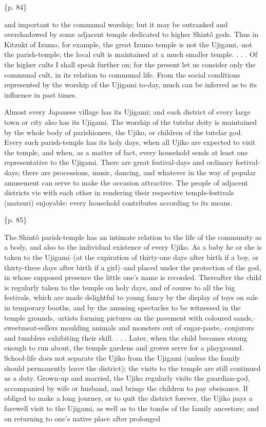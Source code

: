 \{p. 84\}

and important to the communal worship; but it may be outranked and overshadowed by some adjacent temple dedicated to higher Shintô gods. Thus in Kitzuki of Izumo, for example, the great Izumo temple is not the Ujigami,--not the parish-temple; the local cult is maintained at a much smaller temple. . . . Of the higher cults I shall speak further on; for the present let us consider only the communal cult, in its relation to communal life. From the social conditions represented by the worship of the Ujigami to-day, much can be inferred as to its influence in past times.



Almost every Japanese village has its Ujigami; and each district of every large town or city also has its Ujigami. The worship of the tutelar deity is maintained by the whole body of parishioners, the Ujiko, or children of the tutelar god. Every such parish-temple has its holy days, when all Ujiko are expected to visit the temple, and when, as a matter of fact, every household sends at least one representative to the Ujigami. There are great festival-days and ordinary festival-days; there are processions, music, dancing, and whatever in the way of popular amusement can serve to make the occasion attractive. The people of adjacent districts vie with each other in rendering their respective temple-festivals (matsuri) enjoyable: every household contributes according to its means.

\{p. 85\}

The Shintô parish-temple has an intimate relation to the life of the community as a body, and also to the individual existence of every Ujiko. As a baby he or she is taken to the Ujigami--(at the expiration of thirty-one days after birth if a boy, or thirty-three days after birth if a girl)--and placed under the protection of the god, in whose supposed presence the little one's name is recorded. Thereafter the child is regularly taken to the temple on holy days, and of course to all the big festivals, which are made delightful to young fancy by the display of toys on sale in temporary booths, and by the amusing spectacles to be witnessed in the temple grounds,--artists forming pictures on the pavement with coloured sands,--sweetmeat-sellers moulding animals and monsters out of sugar-paste,--conjurors and tumblers exhibiting their skill. . . . Later, when the child becomes strong enough to run about, the temple gardens and groves serve for a playground. School-life does not separate the Ujiko from the Ujigami (unless the family should permanently leave the district); the visits to the temple are still continued as a duty. Grown-up and married, the Ujiko regularly visits the guardian-god, accompanied by wife or husband, and brings the children to pay obeisance. If obliged to make a long journey, or to quit the district forever, the Ujiko pays a farewell visit to the Ujigami, as well as to the tombs of the family ancestors; and on returning to one's native place after prolonged

